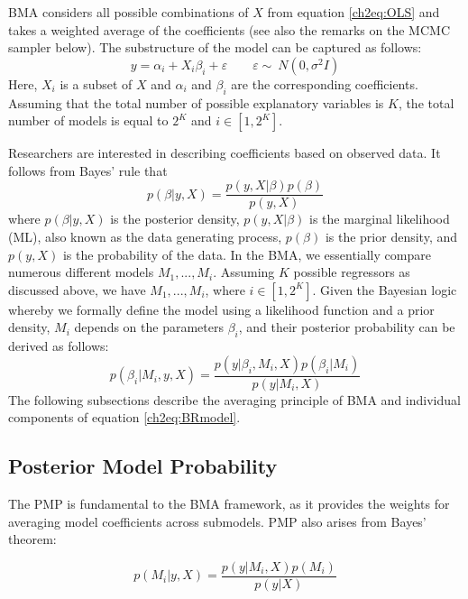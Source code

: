 \begin{refsection}
\ac{BMA} considers all possible combinations of $X$ from equation \ref{ch2eq:OLS} and takes a weighted average of the coefficients (see also the remarks on the \ac{MCMC} sampler below). The substructure of the model can be captured as follows:
%
\begin{equation}\label{ch2eq:OLSsub}
	y = \alpha_{i} + X_{i}\beta_{i}+ \varepsilon \qquad \varepsilon  \sim\ N(0, \sigma^{2}I)
\end{equation}
%
Here, $X_{i}$ is a subset of $X$ and $\alpha_{i} $ and $ \beta_{i}$ are the corresponding coefficients. Assuming that the total number of possible explanatory variables is $K$, the total number of models is equal to $2^{K}$ and $i \in [1,2^{K}]$. 

Researchers are interested in describing coefficients based on observed data. It follows from Bayes' rule that
%
\begin{equation}\label{ch2eq:BRmodel}
	p(\beta \vert y,X) = \frac{p(y,X\vert \beta)p(\beta)}{p(y,X)}
\end{equation}
where $p(\beta \vert y, X)$ is the posterior density, $p(y, X\vert \beta)$ is the marginal likelihood (ML), also known as the data generating process, $p(\beta)$ is the prior density, and $p(y,X)$ is the probability of the data. In the \ac{BMA}, we essentially compare numerous different models $M_{1},...,M_{i}$.  Assuming $K$ possible regressors as discussed above, we have $M_{1},...,M_{i}$, where $i \in [1,2^{K}]$. Given the Bayesian logic whereby we formally define the model using a likelihood function and a prior density, $M_{i}$ depends on the parameters $\beta_{i}$, and their posterior probability can be derived as follows:
\begin{equation}\label{ch2eq:BROM}
	p(\beta_{i} \vert M_{i},y,X) = \frac{p(y\vert \beta_{i},M_{i},X)p(\beta_{i}\vert M_{i})}{p(y \vert M_{i},X)}
\end{equation}
The following subsections describe the averaging principle of \ac{BMA} and individual components of equation \ref{ch2eq:BRmodel}.
%
\subsection{Posterior Model Probability}
%
The \ac{PMP} is fundamental to the \ac{BMA} framework, as it provides the weights for averaging model coefficients across submodels. \ac{PMP} also arises from Bayes' theorem:

\begin{equation}\label{ch2eq:PMPmain}
	p(M_{i} \vert y,X) = \frac{p(y\vert M_{i},X)p(M_{i})}{p(y \vert X)}
\end{equation}


\end{refsection}
